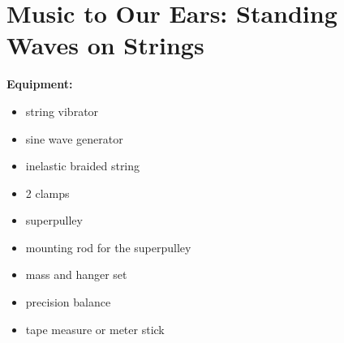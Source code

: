 \section{Music to Our Ears: Standing Waves on Strings}

\makelabheader %

\vspace{0.2in}

\textbf{Equipment:}
\begin{itemize} \itemsep 0pt
\item  string vibrator 
\item  sine wave generator
\item  inelastic braided string
\item  2 clamps
\item  superpulley
\item  mounting rod for the superpulley
\item  mass and hanger set
\item  precision balance
\item  tape measure or meter stick
\end{itemize}


